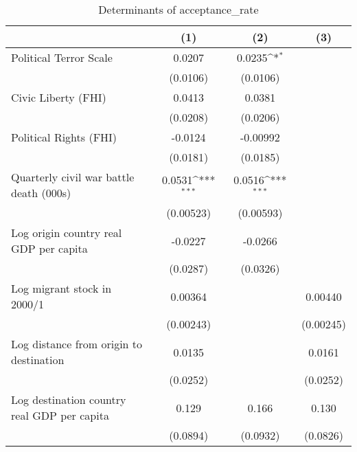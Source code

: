 \begin{table}[htbp]\centering
\def\sym#1{\ifmmode^{#1}\else\(^{#1}\)\fi}
\caption{Determinants of acceptance\_rate}
\begin{tabular}{l*{3}{c}}
\hline\hline
                    &\multicolumn{1}{c}{(1)}         &\multicolumn{1}{c}{(2)}         &\multicolumn{1}{c}{(3)}         \\
\hline
Political Terror Scale&      0.0207         &      0.0235\sym{*}  &                     \\
                    &    (0.0106)         &    (0.0106)         &                     \\
[1em]
Civic Liberty (FHI) &      0.0413         &      0.0381         &                     \\
                    &    (0.0208)         &    (0.0206)         &                     \\
[1em]
Political Rights (FHI)&     -0.0124         &    -0.00992         &                     \\
                    &    (0.0181)         &    (0.0185)         &                     \\
[1em]
Quarterly civil war battle death (000s)&      0.0531\sym{***}&      0.0516\sym{***}&                     \\
                    &   (0.00523)         &   (0.00593)         &                     \\
[1em]
Log origin country real GDP per capita&     -0.0227         &     -0.0266         &                     \\
                    &    (0.0287)         &    (0.0326)         &                     \\
[1em]
Log migrant stock in 2000/1&     0.00364         &                     &     0.00440         \\
                    &   (0.00243)         &                     &   (0.00245)         \\
[1em]
Log distance from origin to destination&      0.0135         &                     &      0.0161         \\
                    &    (0.0252)         &                     &    (0.0252)         \\
[1em]
Log destination country real GDP per capita&       0.129         &       0.166         &       0.130         \\
                    &    (0.0894)         &    (0.0932)         &    (0.0826)         \\

\end{tabular}
\end{table}
